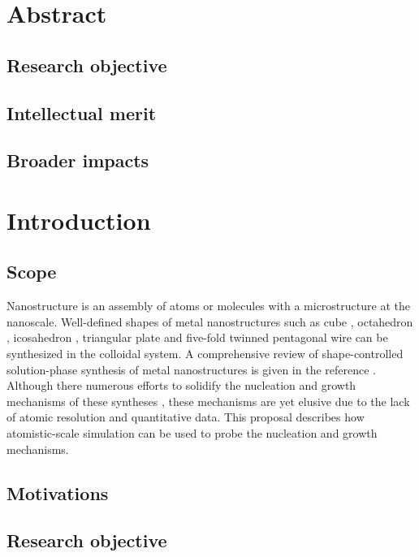 \section{Abstract}

\subsection{Research objective}

\subsection{Intellectual merit}

\subsection{Broader impacts}

\section{Introduction}

\subsection{Scope}

Nanostructure is an assembly of atoms or molecules with a microstructure at the nanoscale. Well-defined shapes of metal nanostructures such as cube \cite{Im_2005}, octahedron \cite{Xia_2012}, icosahedron \cite{Xiong_2007}, triangular plate \cite{Lofton_2005} and five-fold twinned pentagonal wire \cite{Tsuji_2008} can be synthesized in the colloidal system. A comprehensive review of shape-controlled solution-phase synthesis of metal nanostructures is given in the reference \cite{Xia_2008}. Although there numerous efforts to solidify the nucleation and growth mechanisms of these syntheses \cite{Lofton_2005,Mariscal_2012,Park_2013,Viswanath_2009}, these mechanisms are yet elusive due to the lack of atomic resolution and quantitative data. This proposal describes how atomistic-scale simulation can be used to probe the nucleation and growth mechanisms.

\subsection{Motivations}

\subsection{Research objective}

